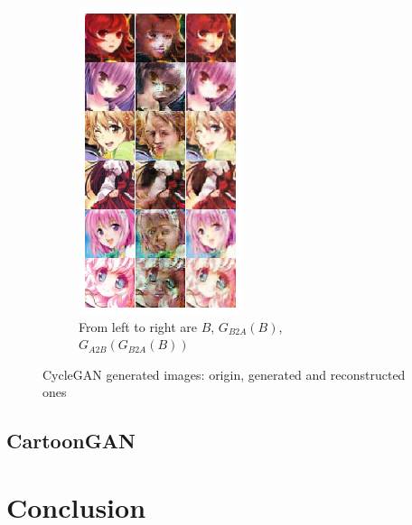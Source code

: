 \documentclass[10pt,twocolumn,letterpaper]{article}
\begin{document}
\begin{figure}[h]
\begin{subfigure}{.48\linewidth}
      \includegraphics[width=.7\linewidth]{cycle-result-target.png}
      \caption{From left to right are $B$, $G_{B2A}(B)$, $G_{A2B}(G_{B2A}(B))$}
   \end{subfigure}
   \caption{CycleGAN generated images: origin, generated and reconstructed ones}
   \label{fig:cyclegan-examples}
\end{figure}

\subsection{CartoonGAN}

\section{Conclusion}

{\small


}
\end{document}
